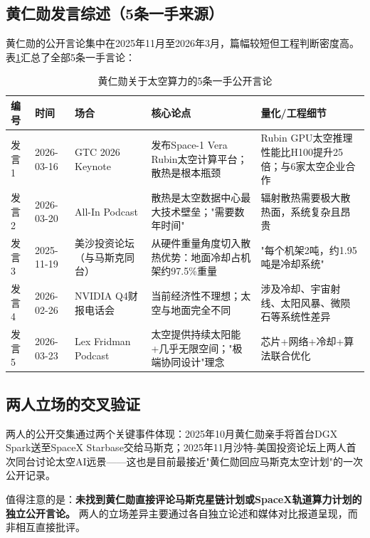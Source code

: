 \subsection{黄仁勋发言综述（5条一手来源）}

黄仁勋的公开言论集中在2025年11月至2026年3月，篇幅较短但工程判断密度高。表\ref{tab:huang_statements}汇总了全部5条一手言论：

\begin{table}[H]
\centering
\caption{黄仁勋关于太空算力的5条一手公开言论}
\label{tab:huang_statements}
\small
\begin{tabular}{p{0.7cm}p{1.8cm}p{1.8cm}p{4.5cm}p{3.0cm}}
\toprule
\textbf{编号} & \textbf{时间} & \textbf{场合} & \textbf{核心论点} & \textbf{量化/工程细节} \\
\midrule
发言1 & 2026-03-16 & GTC 2026 Keynote & 发布Space-1 Vera Rubin太空计算平台；散热是根本瓶颈 & Rubin GPU太空推理性能比H100提升25倍；与6家太空企业合作 \cite{huang2026gtc} \\
\hline
发言2 & 2026-03-20 & All-In Podcast & 散热是太空数据中心最大技术壁垒；"需要数年时间" & 辐射散热需要极大散热面，系统复杂且昂贵 \cite{huang2026allin} \\
\hline
发言3 & 2025-11-19 & 美沙投资论坛（与马斯克同台） & 从硬件重量角度切入散热优势：地面冷却占机架约97.5\%重量 & "每个机架2吨，约1.95吨是冷却系统" \cite{musk_huang2025saudi} \\
\hline
发言4 & 2026-02-26 & NVIDIA Q4财报电话会 & 当前经济性不理想；太空与地面完全不同 & 涉及冷却、宇宙射线、太阳风暴、微陨石等系统性差异 \cite{huang2026earnings} \\
\hline
发言5 & 2026-03-23 & Lex Fridman Podcast & 太空提供持续太阳能+几乎无限空间；"极端协同设计"理念 & 芯片+网络+冷却+算法联合优化 \cite{huang2026lex} \\
\bottomrule
\end{tabular}
\end{table}

\subsection{两人立场的交叉验证}

两人的公开交集通过两个关键事件体现：2025年10月黄仁勋亲手将首台DGX Spark送至SpaceX Starbase交给马斯克；2025年11月沙特-美国投资论坛上两人首次同台讨论太空AI远景——这也是目前最接近"黄仁勋回应马斯克太空计划"的一次公开记录\cite{musk_huang2025saudi}。

值得注意的是：\textbf{未找到黄仁勋直接评论马斯克星链计划或SpaceX轨道算力计划的独立公开言论。} 两人的立场差异主要通过各自独立论述和媒体对比报道呈现，而非相互直接批评。

